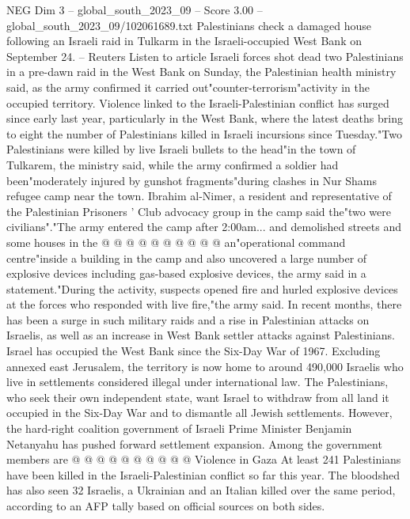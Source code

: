 \begin{textsample}{NEG Dim 3 – global\_south\_2023\_09 – Score 3.00 – global\_south\_2023\_09/102061689.txt}  \label{ex:f3_neg_334}
Palestinians check a damaged house following an Israeli raid in Tulkarm in the Israeli-occupied West Bank on September 24. -- Reuters Listen to article Israeli forces shot dead two Palestinians in a pre-dawn raid in the West Bank on Sunday, the Palestinian health ministry said, as the army confirmed it carried out"counter-terrorism"activity in the occupied territory.
Violence linked to the Israeli-Palestinian conflict has surged since early last year, particularly in the West Bank, where the latest deaths bring to eight the number of Palestinians killed in Israeli incursions since Tuesday."Two Palestinians were killed by live Israeli bullets to the head"in the town of Tulkarem, the ministry said, while the army confirmed a soldier had been"moderately injured by gunshot fragments"during clashes in Nur Shams refugee camp near the town.
Ibrahim al-Nimer, a resident and representative of the Palestinian Prisoners ' Club advocacy group in the camp said the"two were civilians"."The army entered the camp after 2:00am... and demolished streets and some houses in the @ @ @ @ @ @ @ @ @ @ an"operational command centre"inside a building in the camp and also uncovered a large number of explosive devices including gas-based explosive devices, the army said in a statement."During the activity, suspects opened fire and hurled explosive devices at the forces who responded with live fire,"the army said.
In recent months, there has been a surge in such military raids and a rise in Palestinian attacks on Israelis, as well as an increase in West Bank settler attacks against Palestinians.
Israel has occupied the West Bank since the Six-Day War of 1967.
Excluding annexed east Jerusalem, the territory is now home to around 490,000 Israelis who live in settlements considered illegal under international law.
The Palestinians, who seek their own independent state, want Israel to withdraw from all land it occupied in the Six-Day War and to dismantle all Jewish settlements.
However, the hard-right coalition government of Israeli Prime Minister Benjamin Netanyahu has pushed forward settlement expansion.
Among the government members are @ @ @ @ @ @ @ @ @ @ Violence in Gaza At least 241 Palestinians have been killed in the Israeli-Palestinian conflict so far this year.
The bloodshed has also seen 32 Israelis, a Ukrainian and an Italian killed over the same period, according to an AFP tally based on official sources on both sides.

\end{textsample}
